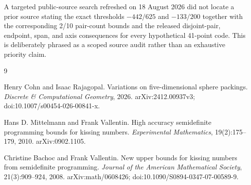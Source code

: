\documentclass[11pt]{article}
\begin{document}
A targeted public-source search refreshed on 18 August 2026 did not locate a
prior source stating the exact thresholds $-442/625$ and $-133/200$ together
with the corresponding 2/10 pair-count bounds and the released
disjoint-pair, endpoint, span, and axis consequences for every hypothetical
41-point code. This is deliberately phrased as a scoped source audit rather
than an exhaustive priority claim.

\begin{thebibliography}{9}

Henry Cohn and Isaac Rajagopal.
\newblock Variations on five-dimensional sphere packings.
\newblock \emph{Discrete \& Computational Geometry}, 2026.
\newblock arXiv:2412.00937v3; doi:10.1007/s00454-026-00841-x.

Hans D. Mittelmann and Frank Vallentin.
\newblock High accuracy semidefinite programming bounds for kissing numbers.
\newblock \emph{Experimental Mathematics}, 19(2):175--179, 2010.
\newblock arXiv:0902.1105.

Christine Bachoc and Frank Vallentin.
\newblock New upper bounds for kissing numbers from semidefinite programming.
\newblock \emph{Journal of the American Mathematical Society},
21(3):909--924, 2008.
\newblock arXiv:math/0608426; doi:10.1090/S0894-0347-07-00589-9.

\end{thebibliography}
\end{document}
